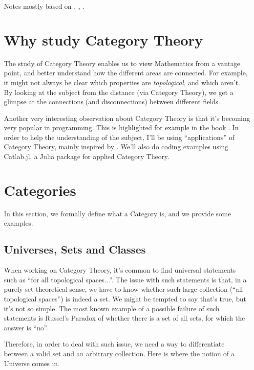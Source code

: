 Notes mostly based on \citet{maico2020categoria},
\citet{bradley2020topology}, \citet{borceux1994handbook}.

\section{Why study Category Theory}

The study of Category Theory enables us to view Mathematics from a vantage
point, and better understand how the different areas are connected. For example,
it might not always be clear which properties are \textit{topological}, and which aren't.
By looking at the subject from the distance (via Category Theory), we get
a glimpse at the connections (and disconnections) between different fields.

Another very interesting observation about Category Theory is that it's
becoming very popular in programming. This is highlighted for example
in the book \citet{milewski2018category}. In order to help
the understanding of the subject, I'll be using ``applications''
of Category Theory, mainly inspired by \citet{fong2019invitation}.
We'll also do coding examples using Catlab.jl, a Julia package
for applied Category Theory.

\section{Categories}

In this section, we formally define what a Category is, and we provide
some examples.

\subsection{Universes, Sets and Classes}

When working on Category Theory, it's common to find universal
statements such as ``for all topological spaces...''. The issue
with such statements is that, in a purely set-theoretical sense,
we have to know whether such large collection (``all topological spaces'')
is indeed a set. We might be tempted to say that's true, but
it's not so simple. The most known example of a possible failure of such
statements is Russel's Paradox of whether there is a set of all sets, for
which the answer is ``no''.

Therefore, in order to deal with such issue, we need a way to differentiate
between a valid set and an arbitrary collection. Here is where the notion of a Universe comes in.

